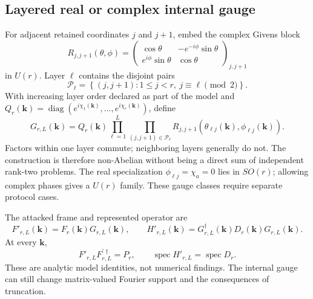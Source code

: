 \documentclass[11pt]{article}
\newenvironment{prospective}{\color{prospectivered}}{}
\begin{document}
\begin{prospective}
\subsection{Layered real or complex internal gauge}
For adjacent retained coordinates $j$ and $j+1$, embed the complex Givens block
\begin{equation}
 R_{j,j+1}(\theta,\phi)=
 \begin{pmatrix}
 \cos\theta&-e^{-i\phi}\sin\theta\\
 e^{i\phi}\sin\theta&\cos\theta
 \end{pmatrix}_{j,j+1}
\end{equation}
in $U(r)$. Layer $\ell$ contains the disjoint pairs
\begin{equation}
 \mathcal P_\ell=\left\{(j,j+1):1\leq j<r,\ j\equiv\ell\pmod 2\right\}.
\end{equation}
With increasing layer order declared as part of the model and
$Q_r(\mathbf k)=\operatorname{diag}(e^{i\chi_1(\mathbf k)},\ldots,
e^{i\chi_r(\mathbf k)})$, define
\begin{equation}
 G_{r,L}(\mathbf k)=Q_r(\mathbf k)
 \prod_{\ell=1}^{L}
 \prod_{(j,j+1)\in\mathcal P_\ell}
 R_{j,j+1}\!\left(\theta_{\ell j}(\mathbf k),
 \phi_{\ell j}(\mathbf k)\right).
\end{equation}
Factors within one layer commute; neighboring layers generally do not. The construction
is therefore non-Abelian without being a direct sum of independent rank-two problems.
The real specialization $\phi_{\ell j}=\chi_a=0$ lies in $SO(r)$; allowing complex phases
gives a $U(r)$ family. These gauge classes require separate protocol cases.

The attacked frame and represented operator are
\begin{equation}
 F'_{r,L}(\mathbf k)=F_r(\mathbf k)G_{r,L}(\mathbf k),
 \qquad
 H'_{r,L}(\mathbf k)=G_{r,L}^\dagger(\mathbf k)
 D_r(\mathbf k)G_{r,L}(\mathbf k).
\end{equation}
At every $\mathbf k$,
\begin{equation}
 F'_{r,L}F_{r,L}^{\prime\dagger}=P_r,
 \qquad
 \operatorname{spec}H'_{r,L}=\operatorname{spec}D_r.
\end{equation}
These are analytic model identities, not numerical findings. The internal gauge can
still change matrix-valued Fourier support and the consequences of truncation.


\end{prospective}
\end{document}
